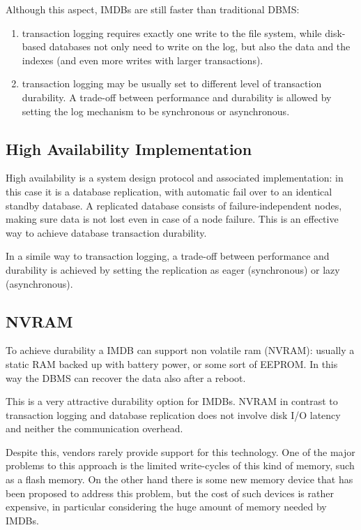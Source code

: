 			Although this aspect, IMDBs are still faster than traditional DBMS:
			
			\begin{enumerate}
				\item transaction logging requires exactly one write to the file system,
				while disk-based databases not only need to write on the log, but also the data 
				and the indexes (and even more writes with larger transactions).
				\item transaction logging may be usually set to different level of transaction 
				durability. A trade-off between performance and durability is allowed by 
				setting the log mechanism to be synchronous or asynchronous.
			\end{enumerate}
			
		\subsection{High Availability Implementation}
			High availability is a system design protocol and associated 
			implementation: in this case it is a database replication, 
			with automatic fail over to an identical standby database.	A replicated 
			database consists of failure-independent nodes, making sure data is not lost even
			in case of a node failure. This is an effective way to achieve database transaction 
			durability.
			
			In a simile way to transaction logging, a trade-off between performance and durability 
			is achieved by setting the replication as eager (synchronous) or lazy (asynchronous).
			
		\subsection{NVRAM}
			To achieve durability a IMDB can support non volatile ram (NVRAM):
			usually a static RAM backed up with battery power, or some 
			sort of EEPROM. In this way the DBMS can recover the data also after a reboot.
			
			This is a very attractive durability option for IMDBs. NVRAM in contrast to 
			transaction logging and database replication does not involve disk I/O latency 
			and neither the communication overhead.
			
			Despite this, vendors rarely provide support for this technology.
			One of the major problems to this approach is the limited 
			write-cycles of this kind of memory, such as a flash memory. 	
			On the other hand there is some new memory device that has 
			been proposed to address this problem, but the cost of such 
			devices is rather expensive, in particular considering the huge 
			amount of memory needed by IMDBs.

